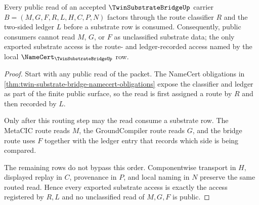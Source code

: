 \begin{theorem}
\label{thm:twin-substrate-bridge-ledger-exactness}
Every public read of an accepted $\TwinSubstrateBridgeUp$ carrier $B=(M,G,F,R,L,H,C,P,N)$ factors through the route classifier $R$ and the two-sided ledger $L$ before a substrate row is consumed. Consequently, public consumers cannot read $M$, $G$, or $F$ as unclassified substrate data; the only exported substrate access is the route- and ledger-recorded access named by the local $\NameCert_{\TwinSubstrateBridgeUp}$ row.
\end{theorem}
\begin{proof}
Start with any public read of the packet. The NameCert obligations in \autoref{thm:twin-substrate-bridge-namecert-obligations} expose the classifier and ledger as part of the finite public surface, so the read is first assigned a route by $R$ and then recorded by $L$.

Only after this routing step may the read consume a substrate row. The MetaCIC route reads $M$, the GroundCompiler route reads $G$, and the bridge route uses $F$ together with the ledger entry that records which side is being compared.

The remaining rows do not bypass this order. Componentwise transport in $H$, displayed replay in $C$, provenance in $P$, and local naming in $N$ preserve the same routed read. Hence every exported substrate access is exactly the access registered by $R,L$ and no unclassified read of $M,G,F$ is public.
\end{proof}

